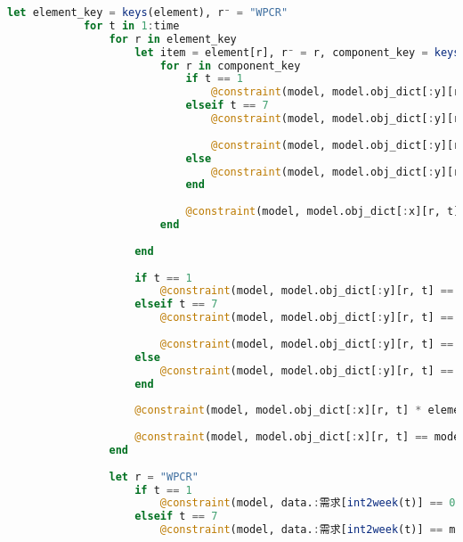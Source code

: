 \begin{appendices}
\begin{lstlisting}[language=julia]
        let element_key = keys(element), r⁻ = "WPCR"
            for t in 1:time
                for r in element_key
                    let item = element[r], r⁻ = r, component_key = keys(item.:组件)
                        for r in component_key
                            if t == 1
                                @constraint(model, model.obj_dict[:y][r, t] == 0 + model.obj_dict[:x][r, t] - item.:需求量[r] * model.obj_dict[:x][r⁻, t])
                            elseif t == 7
                                @constraint(model, model.obj_dict[:y][r, t] == model.obj_dict[:y][r, t-1] + model.obj_dict[:x][r, t] - item.:需求量[r] * model.obj_dict[:x][r⁻, t])
    
                                @constraint(model, model.obj_dict[:y][r, t] == 0)
                            else
                                @constraint(model, model.obj_dict[:y][r, t] == model.obj_dict[:y][r, t-1] + model.obj_dict[:x][r, t] - item.:需求量[r] * model.obj_dict[:x][r⁻, t])
                            end
    
                            @constraint(model, model.obj_dict[:x][r, t] == model.obj_dict[:x][r, t] * model.obj_dict[:ω][r, t])
                        end
    
                    end
    
                    if t == 1
                        @constraint(model, model.obj_dict[:y][r, t] == 0 + model.obj_dict[:x][r, t] - product.:需求量[r] * model.obj_dict[:x][r⁻, t])
                    elseif t == 7
                        @constraint(model, model.obj_dict[:y][r, t] == model.obj_dict[:y][r, t-1] + model.obj_dict[:x][r, t] - product.:需求量[r] * model.obj_dict[:x][r⁻, t])
    
                        @constraint(model, model.obj_dict[:y][r, t] == 0)
                    else
                        @constraint(model, model.obj_dict[:y][r, t] == model.obj_dict[:y][r, t-1] + model.obj_dict[:x][r, t] - product.:需求量[r] * model.obj_dict[:x][r⁻, t])
                    end
    
                    @constraint(model, model.obj_dict[:x][r, t] * element[r].:工时消耗 == model.obj_dict[:M][r, t] * model.obj_dict[:ω][r, t])
    
                    @constraint(model, model.obj_dict[:x][r, t] == model.obj_dict[:x][r, t] * model.obj_dict[:ω][r, t])
                end
    
                let r = "WPCR"
                    if t == 1
                        @constraint(model, data.:需求[int2week(t)] == 0 + model.obj_dict[:x][r, t] - model.obj_dict[:y][r, t])
                    elseif t == 7
                        @constraint(model, data.:需求[int2week(t)] == model.obj_dict[:y][r, t-1] + model.obj_dict[:x][r, t] - model.obj_dict[:y][r, t])
    

\end{lstlisting}
\end{appendices}
